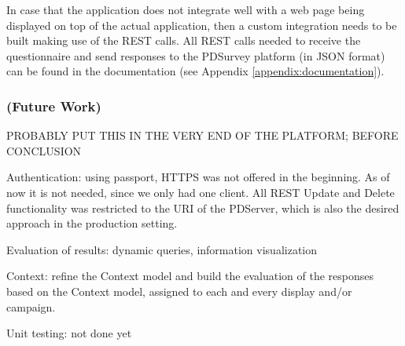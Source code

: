 	In case that the application does not integrate well with a web page being displayed on top of the actual application, then a custom integration needs to be built making use of the REST calls. All REST calls needed to receive the questionnaire and send responses to the PDSurvey platform (in JSON format) can be found in the documentation (see Appendix \ref{appendix:documentation}).



	\subsubsection{(Future Work)}

		PROBABLY PUT THIS IN THE VERY END OF THE PLATFORM; BEFORE CONCLUSION


		Authentication: using passport, HTTPS was not offered in the beginning. As of now it is not needed, since we only had one client. All REST Update and Delete functionality was restricted to the URI of the PDServer, which is also the desired approach in the production setting.

		Evaluation of results: dynamic queries, information visualization

		Context: refine the Context model and build the evaluation of the responses based on the Context model, assigned to each and every display and/or campaign.

		Unit testing: not done yet

